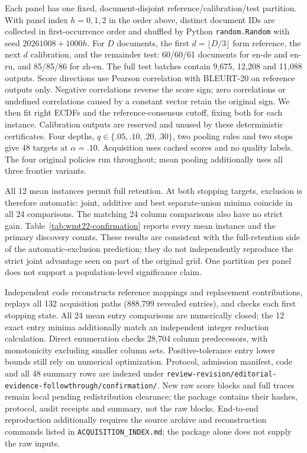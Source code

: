 Each panel has one fixed, document-disjoint reference/calibration/test partition. With panel index $h=0,1,2$ in the order above, distinct document IDs are collected in first-occurrence order and shuffled by Python \texttt{random.Random} with seed $20261008+1000h$. For $D$ documents, the first $d=\lfloor D/3\rfloor$ form reference, the next $d$ calibration, and the remainder test: 60/60/61 documents for en-de and en-ru, and 85/85/86 for zh-en. The full test batches contain 9,675, 12,208 and 11,088 outputs. Score directions use Pearson correlation with BLEURT-20 on reference outputs only. Negative correlations reverse the score sign; zero correlations or undefined correlations caused by a constant vector retain the original sign. We then fit right ECDFs and the reference-consensus cutoff, fixing both for each instance. Calibration outputs are reserved and unused by these deterministic certificates. Four depths, $q\in\{.05,.10,.20,.30\}$, two pooling rules and two stops give 48 targets at $\alpha=.10$. Acquisition uses cached scores and no quality labels. The four original policies run throughout; mean pooling additionally uses all three frontier variants.

All 12 mean instances permit full retention. At both stopping targets, exclusion is therefore automatic: joint, additive and best separate-union minima coincide in all 24 comparisons. The matching 24 column comparisons also have no strict gain. Table~\ref{tab:wmt22-confirmation} reports every mean instance and the primary discovery counts. These results are consistent with the full-retention side of the automatic-exclusion prediction; they do not independently reproduce the strict joint advantage seen on part of the original grid. One partition per panel does not support a population-level significance claim.

Independent code reconstructs reference mappings and replacement contributions, replays all 132 acquisition paths (888,799 revealed entries), and checks each first stopping state. All 24 mean entry comparisons are numerically closed; the 12 exact entry minima additionally match an independent integer reduction calculation. Direct enumeration checks 28,704 column predecessors, with monotonicity excluding smaller column sets. Positive-tolerance entry lower bounds still rely on numerical optimization. Protocol, admission manifest, code and all 48 summary rows are indexed under \nolinkurl{review-revision/editorial-evidence-followthrough/confirmation/}. New raw score blocks and full traces remain local pending redistribution clearance; the package contains their hashes, protocol, audit receipts and summary, not the raw blocks. End-to-end reproduction additionally requires the source archive and reconstruction commands listed in \nolinkurl{ACQUISITION_INDEX.md}; the package alone does not supply the raw inputs.


